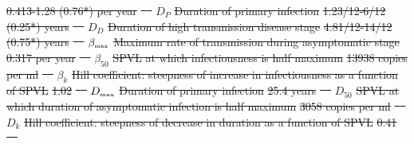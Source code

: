 \documentclass[10pt,letterpaper]{article}
\newcommand{\tsub}[2]{#1_{{\textrm{\tiny #2}}}}
\providecommand{\DIFdeltex}[1]{{\protect\color{red}\sout{#1}}}                      %
\providecommand{\DIFdelFL}[1]{\DIFdel{#1}} %
\providecommand{\DIFdel}[1]{\texorpdfstring{\DIFdeltex{#1}}{}} %
\begin{document}
\DIFdelFL{0.413-1.28 (0.76*) per year }%
\DIFdelFL{\mbox{%
\cite{hollingsworth_hiv1_2008} }%
}%
\DIFdelFL{$D_P$ }%
\DIFdelFL{Duration of primary infection }%
\DIFdelFL{1.23/12-6/12 (0.25*) years }%
\DIFdelFL{\mbox{%
\cite{hollingsworth_hiv1_2008} }%
}%
\DIFdelFL{$D_D$ }%
\DIFdelFL{Duration of high transmission disease stage }%
\DIFdelFL{4.81/12-14/12 (0.75*) years }%
\DIFdelFL{\mbox{%
\cite{hollingsworth_hiv1_2008} }%
}%
\DIFdelFL{$\tsub{\beta}{max}$ }%
\DIFdelFL{Maximum rate of transmission during asymptomatic stage }%
\DIFdelFL{0.317 per year }%
\DIFdelFL{\mbox{%
\cite{shirreff_transmission_2011} }%
}%
\DIFdelFL{$\beta_{50}$ }%
\DIFdelFL{SPVL at which infectiousness is half maximum }%
\DIFdelFL{13938 copies per ml }%
\DIFdelFL{\mbox{%
\cite{shirreff_transmission_2011} }%
}%
\DIFdelFL{$\beta_k$ }%
\DIFdelFL{Hill coefficient: steepness of increase in infectiousness as a function of SPVL }%
\DIFdelFL{1.02 }%
\DIFdelFL{\mbox{%
\cite{shirreff_transmission_2011} }%
}%
\DIFdelFL{$\tsub{D}{max}$ }%
\DIFdelFL{Duration of primary infection }%
\DIFdelFL{25.4 years }%
\DIFdelFL{\mbox{%
\cite{shirreff_transmission_2011} }%
}%
\DIFdelFL{$D_{50}$ }%
\DIFdelFL{SPVL at which duration of asymptomatic infection is half maximum }%
\DIFdelFL{3058 copies per ml }%
\DIFdelFL{\mbox{%
\cite{shirreff_transmission_2011} }%
}%
\DIFdelFL{$D_{k}$ }%
\DIFdelFL{Hill coefficient: steepness of decrease in duration as a function of SPVL }%
\DIFdelFL{0.41 }%
\DIFdelFL{\mbox{%
\cite{shirreff_transmission_2011} }%
}%
\end{document}

